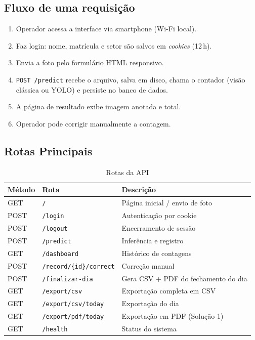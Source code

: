 \documentclass[12pt,a4paper]{article}
\begin{document}
\subsection{Fluxo de uma requisi\c{c}\~ao}

\begin{enumerate}[leftmargin=*, label=\arabic*.]
  \item Operador acessa a interface via smartphone (Wi-Fi local).
  \item Faz login: nome, matr\'icula e setor s\~ao salvos em \emph{cookies} (12\,h).
  \item Envia a foto pelo formul\'ario HTML responsivo.
  \item \texttt{POST /predict} recebe o arquivo, salva em disco, chama o contador
        (vis\~ao cl\'assica ou YOLO) e persiste no banco de dados.
  \item A p\'agina de resultado exibe imagem anotada e total.
  \item Operador pode corrigir manualmente a contagem.
\end{enumerate}

\subsection{Rotas Principais}

\begin{table}[H]
  \centering
  \caption{Rotas da API}
  \label{tab:rotas}
  \begin{tabular}{lll}
    \toprule
    \textbf{M\'etodo} & \textbf{Rota} & \textbf{Descri\c{c}\~ao} \\
    \midrule
    GET  & \texttt{/}                      & P\'agina inicial / envio de foto \\
    POST & \texttt{/login}                 & Autentica\c{c}\~ao por cookie \\
    POST & \texttt{/logout}                & Encerramento de sess\~ao \\
    POST & \texttt{/predict}               & Infer\^encia e registro \\
    GET  & \texttt{/dashboard}             & Hist\'orico de contagens \\
    POST & \texttt{/record/\{id\}/correct} & Corre\c{c}\~ao manual \\
    POST & \texttt{/finalizar-dia}         & Gera CSV + PDF do fechamento do dia \\
    GET  & \texttt{/export/csv}            & Exporta\c{c}\~ao completa em CSV \\
    GET  & \texttt{/export/csv/today}      & Exporta\c{c}\~ao do dia \\
    GET  & \texttt{/export/pdf/today}      & Exporta\c{c}\~ao em PDF (Solu\c{c}\~ao 1) \\
    GET  & \texttt{/health}               & Status do sistema \\
    \bottomrule
  \end{tabular}
\end{table}
\end{document}
